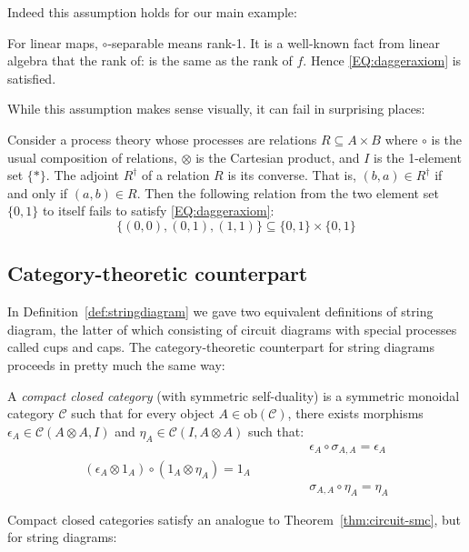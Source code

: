 \documentclass[10pt]{article}
\begin{document}
Indeed this assumption holds for our main example:
\begin{example}
  For linear maps, $\circ$-separable means rank-1. It is a well-known fact from linear algebra that the rank of:
  is the same as the rank of $f$. Hence \eqref{EQ:daggeraxiom} is satisfied.
\end{example}

While this assumption makes sense visually, it can fail in surprising places:
\begin{example}
  Consider a process theory whose processes are relations $R \subseteq A \times B$ where $\circ$ is the usual composition of relations, $\otimes$ is the Cartesian product, and $I$ is the 1-element set $\{ * \}$. The adjoint $R^\dagger$ of a relation $R$ is its converse. That is, $(b,a) \in R^\dagger$ if and only if $(a,b) \in R$. Then the following relation from the two element set $\{0,1\}$ to itself fails to satisfy \eqref{EQ:daggeraxiom}:
  \[ 
  \{ (0,0), (0,1), (1,1) \} \subseteq \{0,1\} \times \{0,1\} 
  \]
\end{example}

\subsection{Category-theoretic counterpart}

In Definition~\ref{def:stringdiagram} we gave two equivalent definitions 
of string diagram, the latter of which consisting of circuit diagrams with special processes called cups and caps. The category-theoretic counterpart for string diagrams proceeds in pretty much the same way:

\begin{definition}\label{def:compact-closed}
  A \textit{compact closed category} (with symmetric self-duality) is a symmetric monoidal category $\mathcal C$ such that for every object $A \in \textrm{ob}(\mathcal C)$, there exists morphisms $\epsilon_A \in \mathcal C(A \otimes A, I)$ and $\eta_A \in \mathcal C(I, A \otimes A)$ such that:  
\[ 
\begin{array}{ccc}
& &  \epsilon_A \circ \sigma_{A,A} = \epsilon_A\\
(\epsilon_A \otimes 1_A) \circ (1_A \otimes \eta_A) = 1_A & \qquad\quad & \\
& & \sigma_{A,A} \circ \eta_A = \eta_A
\end{array}
  \]
\end{definition}

Compact closed categories satisfy an analogue to Theorem~\ref{thm:circuit-smc}, but for string diagrams:
\end{document}
